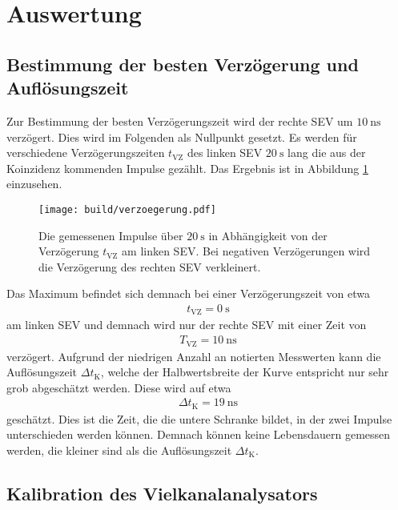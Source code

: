 \section{Auswertung}
\label{sec:Auswertung}

\subsection{Bestimmung der besten Verzögerung und Auflösungszeit}

Zur Bestimmung der besten Verzögerungszeit wird der rechte SEV um $\SI{10}{\nano\second}$ verzögert.
Dies wird im Folgenden als Nullpunkt gesetzt.
Es werden für verschiedene Verzögerungszeiten $t_\text{VZ}$ des linken SEV $\SI{20}{\second}$ lang die aus der Koinzidenz kommenden Impulse gezählt.
Das Ergebnis ist in Abbildung \ref{plot:verzoegerung} einzusehen.
\begin{figure}
  \centering
  \texttt{[image: build/verzoegerung.pdf]}
  \caption{Die gemessenen Impulse über $\SI{20}{\second}$ in Abhängigkeit von der Verzögerung $t_\text{VZ}$ am linken SEV. Bei negativen Verzögerungen wird die Verzögerung des rechten SEV verkleinert.}
  \label{plot:verzoegerung}
\end{figure}
Das Maximum befindet sich demnach bei einer Verzögerungszeit von etwa
\begin{align*}
  t_{\text{VZ}} = \SI{0}{\second}
\end{align*}
am linken SEV und demnach wird nur der rechte SEV mit einer Zeit von
\begin{align*}
  T_{\text{VZ}} = \SI{10}{\nano\second}
\end{align*}
verzögert.
Aufgrund der niedrigen Anzahl an notierten Messwerten kann die Auflösungszeit $\Delta t_\text{K}$, welche der Halbwertsbreite der Kurve entspricht nur sehr grob abgeschätzt werden.
Diese wird auf etwa
\begin{align*}
  \Delta t_\text{K} = \SI{19}{\nano\second}
\end{align*}
geschätzt.
Dies ist die Zeit, die die untere Schranke bildet, in der zwei Impulse unterschieden werden können.
Demnach können keine Lebensdauern gemessen werden, die kleiner sind als die Auflösungszeit $\Delta t_\text{K}$.

\subsection{Kalibration des Vielkanalanalysators}

